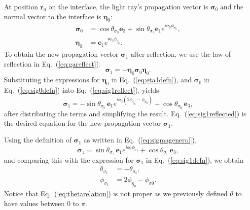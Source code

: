 \documentclass[a4paper,twocolumn,superscriptaddress]{revtex4-1}
\begin{document}
{At position $\mathbf  r_0$ on the interface, the light ray's propagation vector is $\bm \sigma_0$ and the normal vector to the interface is $\bm  \eta_0$: 
\begin{subequations}
  \begin{align}
    \label{eq:sig0defn}
    \bm \sigma_{0} &= 
    \cos \theta_{ \sigma_0 } \mathbf e_3 + 
    \sin \theta_{ \sigma_0 } \mathbf e_1 e^{i \mathbf e_3 \phi_{ \sigma_0 }} ,
    \\
    \label{eq:eta1defn}
    \bm  \eta_0 &= \mathbf e_1 e^{i \mathbf e_3 \phi_{ \eta_0 } } .
  \end{align}
\end{subequations}
To obtain the new propagation vector $\bm \sigma_1$ after reflection, we use the law of reflection
in Eq.~(\ref{eq:gareflect}):
\begin{equation} 
  \label{eq:sig1reflect}
  \bm \sigma_1 = 
  - \bm  \eta_0 \bm \sigma_0 \bm  \eta_0 .
\end{equation}
Substituting the expressions for $\bm  \eta_0$ in Eq.~(\ref{eq:eta1defn}), 
and $\bm \sigma_0$ in Eq.~(\ref{eq:sig0defn}) into Eq.~(\ref{eq:sig1reflect}), 
yields
\begin{equation} 
  \label{eq:sig1reflected}
  \bm \sigma_1  = 
  - \sin \theta_{ \sigma_0 } \, \mathbf e_1 
  e^{ i \mathbf e_3 (2\phi_{ \eta_0 } - \phi_{ \sigma_0 } ) } + 
  \cos \theta_{ \sigma_0 } \, \mathbf e_3 ,
\end{equation}
after distributing the terms and simplifying the result. Eq.~(\ref{eq:sig1reflected}) is the desired equation for the new propagation vector $\bm \sigma_1$.



Using the definition of $\bm \sigma_1$ as written in Eq.~(\ref{eq:sigmageneral}),
\begin{equation} 
  \label{eq:sig1defn}
  \bm \sigma_1 = 
  \sin \theta_{ \sigma_1 } \, \mathbf e_1 e^{ i \mathbf e_3 \phi_{ \sigma_1 } } 
  + \cos \theta_{ \sigma_1 } \, \mathbf e_3 ,
\end{equation}
and comparing this with the expression for $\bm \sigma_1$ in 
Eq.~(\ref{eq:sig1defn}), we obtain \cite{sugonSPP}
\begin{subequations} 
  \label{eq:anglerelations}
  \begin{align}
    \label{eq:thetarelation} 
    \theta_{ \sigma_1 } &= - \theta_{ \sigma_0 } ,
    \\
    \label{eq:phirelation} 
    \phi_{ \sigma_1 } &= 2\phi_{ \eta_0 } - \phi_{\sigma0} .
    \end{align}
\end{subequations}
Notice that Eq.~(\ref{eq:thetarelation}) is not proper as we 
previously defined $\theta$ to have values between $0$ to $\pi$.

}
\end{document}
